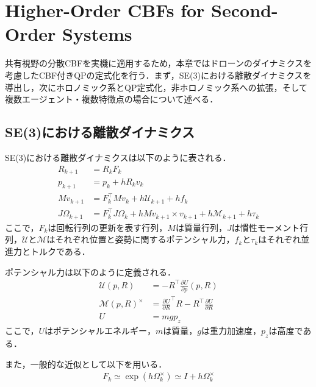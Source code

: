 \section{Higher-Order CBFs for Second-Order Systems}

共有視野の分散CBFを実機に適用するため，本章ではドローンのダイナミクスを考慮したCBF付きQPの定式化を行う．まず，SE(3)における離散ダイナミクスを導出し，次にホロノミック系とQP定式化，非ホロノミック系への拡張，そして複数エージェント・複数特徴点の場合について述べる．

\subsection{SE(3)における離散ダイナミクス}

SE(3)における離散ダイナミクスは以下のように表される．
\begin{equation}
\begin{aligned}
R_{k+1} &= R_k F_k \\
p_{k+1} &= p_k + h R_k v_k \\
M v_{k+1} &= F_k^\top M v_k + h \mathcal{U}_{k+1} + h f_k \\
J \Omega_{k+1} &= F_k^\top J \Omega_{k} + h M v_{k+1} \times v_{k+1} + h \mathcal{M}_{k+1} + h \tau_k
\label{eq:se3_discrete_dynamics}
\end{aligned}
\end{equation}
ここで，$F_k$は回転行列の更新を表す行列，$M$は質量行列，$J$は慣性モーメント行列，$\mathcal{U}$と$\mathcal{M}$はそれぞれ位置と姿勢に関するポテンシャル力，$f_k$と$\tau_k$はそれぞれ並進力とトルクである．

ポテンシャル力は以下のように定義される．
\begin{equation}
\begin{aligned}
\mathcal{U}(p,R) &= -R^\top \frac{\partial U}{\partial p}(p,R) \\
\mathcal{M}(p,R)^\times &= \frac{\partial U}{\partial R}^\top R - R^\top \frac{\partial U}{\partial R} \\
U &= m g p_z
\label{eq:potential_forces}
\end{aligned}
\end{equation}
ここで，$U$はポテンシャルエネルギー，$m$は質量，$g$は重力加速度，$p_z$は高度である．

また，一般的な近似として以下を用いる．
\begin{equation}
\begin{aligned}
F_k \simeq \exp(h \Omega_k^\times) \simeq I + h \Omega_k^\times
\label{eq:rotation_approximation}
\end{aligned}
\end{equation}

